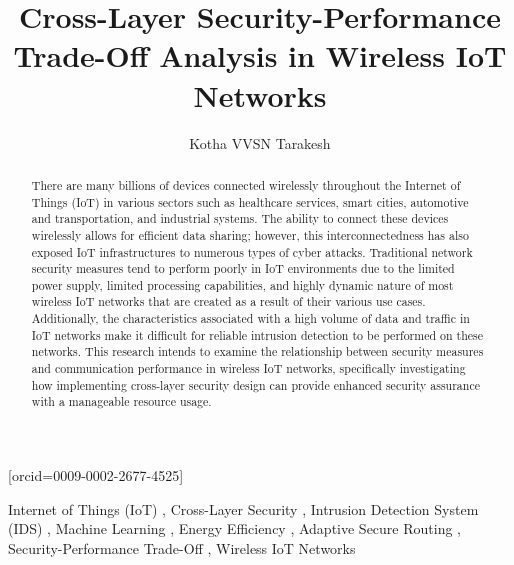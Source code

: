 \documentclass[a4paper,fleqn]{cas-dc}
\numberwithin{equation}{section}
\begin{document}
\let\WriteBookmarks\relax
\def\floatpagepagefraction{1}
\def\textpagefraction{.001}


\title [mode = title]{Cross-Layer Security-Performance Trade-Off Analysis in Wireless IoT Networks}

\author[1]{Kotha VVSN Tarakesh}[orcid=0009-0002-2677-4525]
\address[1]{School of Computer Science and Engineering, VIT-AP University, Amaravathi, Andhra Pradesh, India}



\begin{abstract}
There are many billions of devices  connected wirelessly throughout the Internet of Things (IoT) in various sectors such as healthcare services, smart cities, automotive and transportation, and industrial systems. The ability to connect these devices wirelessly allows for efficient data sharing; however, this interconnectedness has also exposed IoT infrastructures to numerous types of cyber attacks. Traditional network security measures tend to perform poorly in IoT environments due to the limited power supply, limited processing capabilities, and highly dynamic nature of most wireless IoT networks that are created as a result of their various use cases. Additionally, the characteristics associated with a high volume of data and traffic in IoT networks make it difficult for reliable intrusion detection to be performed on these networks. This research intends to examine the relationship between security measures and communication performance in wireless IoT networks, specifically investigating how implementing cross-layer security design can provide enhanced security assurance with a manageable resource usage.
\end{abstract}

\begin{keywords}
Internet of Things (IoT) \sep
Cross-Layer Security \sep
Intrusion Detection System (IDS) \sep
Machine Learning \sep
Energy Efficiency \sep
Adaptive Secure Routing \sep
Security-Performance Trade-Off \sep
Wireless IoT Networks
\end{keywords}

\maketitle
\end{document}
